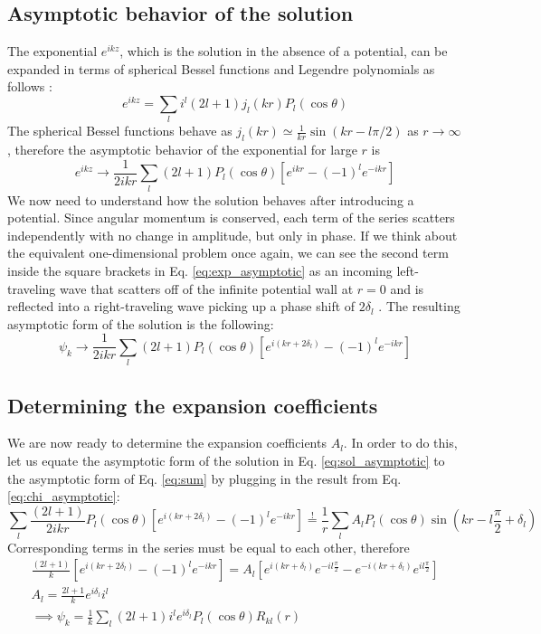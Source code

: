 \subsection{Asymptotic behavior of the solution}
The exponential \(e^{ikz} \), which is the solution in the absence of a potential, can be expanded in terms of spherical Bessel functions and Legendre polynomials as follows \cite{Cohen-Tannoudji}:
\begin{equation}
	e^{ikz} = \sum_{l} i^l (2l+1) j_l(kr)P_l(\cos \theta )
\end{equation}
The spherical Bessel functions behave as \(j_l(kr) \simeq \frac{1}{kr} \sin \left(kr - l \pi /2\right)\) as \(r \to \infty \), therefore the asymptotic behavior of the exponential for large \(r\) is
\begin{equation}\label{eq:exp_asymptotic}
	e^{ikz} \to  \frac{1}{2ikr} \sum_{l} (2l+1) P_l (\cos \theta ) \left[ e^{ikr}  - (-1)^l e^{-ikr} \right]
\end{equation}
We now need to understand how the solution behaves after introducing a potential. Since angular momentum is conserved, each term of the series scatters independently with no change in amplitude, but only in phase. If we think about the equivalent one-dimensional problem once again, we can see the second term inside the square brackets in Eq. \eqref{eq:exp_asymptotic} as an incoming left-traveling wave that scatters off of the infinite potential wall at \(r=0\) and is reflected into a right-traveling wave picking up a phase shift of \(2\delta _l\) \cite{Griffiths}. The resulting asymptotic form of the solution is the following:
\begin{equation}\label{eq:sol_asymptotic}
	\psi_k \to \frac{1}{2ikr}\sum_{l} (2l+1)P_l(\cos \theta )\left[e^{i(kr+2\delta _l)}- (-1)^l e^{-ikr}  \right]
\end{equation}

\subsection{Determining the expansion coefficients}
We are now ready to determine the expansion coefficients \(A_l\). In order to do this, let us equate the asymptotic form of the solution in Eq. \eqref{eq:sol_asymptotic} to the asymptotic form of Eq. \eqref{eq:sum} by plugging in the result from Eq. \eqref{eq:chi_asymptotic}:
\begin{equation}
	\sum_{l} \frac{(2l+1)}{2ikr} P_l(\cos \theta ) \left[e^{i(kr + 2 \delta _l)} - (-1)^{l} e^{-ikr} \right] \overset{!}{=} \frac{1}{r} \sum_{l} A_l P_l(\cos \theta ) \sin (kr-l \frac{\pi}{2} + \delta _l)
\end{equation}
Corresponding terms in the series must be equal to each other, therefore
\begin{gather}
	\frac{(2l+1)}{k}\left[ e^{i(kr+2\delta _l)}-(-1)^l e^{-ikr} \right]
	=
	A_l \left[e^{i(kr + \delta _l)} e^{- il \frac{\pi }{2} } - e^{-i(kr + \delta _l)}e^{il \frac{\pi }{2}} \right]\\
	A_l = \frac{2l+1}{k} e^{i \delta _l} i^l\\
	\implies 
	\psi _k = \frac{1}{k} \sum_{l} (2l+1)i^l e^{i \delta _l} P_l (\cos \theta ) R_{kl} (r) \label{eq:expansion}
\end{gather}

